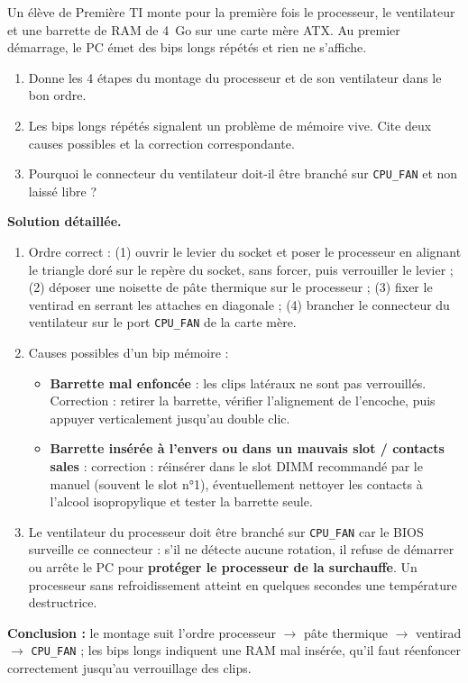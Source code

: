 \documentclass[11pt]{article}
\begin{document}
\begin{exoresolu}
Un élève de Première TI monte pour la première fois le processeur, le ventilateur et une barrette de RAM de \SI{4}{Go} sur une carte mère ATX. Au premier démarrage, le PC émet des bips longs répétés et rien ne s'affiche.
\begin{enumerate}
\item Donne les 4 étapes du montage du processeur et de son ventilateur dans le bon ordre.
\item Les bips longs répétés signalent un problème de mémoire vive. Cite deux causes possibles et la correction correspondante.
\item Pourquoi le connecteur du ventilateur doit-il être branché sur \texttt{CPU\_FAN} et non laissé libre ?
\end{enumerate}
\tcblower
\textbf{Solution détaillée.}
\begin{enumerate}
\item Ordre correct : (1) ouvrir le levier du socket et poser le processeur en alignant le triangle doré sur le repère du socket, sans forcer, puis verrouiller le levier ; (2) déposer une noisette de pâte thermique sur le processeur ; (3) fixer le ventirad en serrant les attaches en diagonale ; (4) brancher le connecteur du ventilateur sur le port \texttt{CPU\_FAN} de la carte mère.
\item Causes possibles d'un bip mémoire :
\begin{itemize}
\item \textbf{Barrette mal enfoncée} : les clips latéraux ne sont pas verrouillés. Correction : retirer la barrette, vérifier l'alignement de l'encoche, puis appuyer verticalement jusqu'au double clic.
\item \textbf{Barrette insérée à l'envers ou dans un mauvais slot / contacts sales} : correction : réinsérer dans le slot DIMM recommandé par le manuel (souvent le slot n°1), éventuellement nettoyer les contacts à l'alcool isopropylique et tester la barrette seule.
\end{itemize}
\item Le ventilateur du processeur doit être branché sur \texttt{CPU\_FAN} car le BIOS surveille ce connecteur : s'il ne détecte aucune rotation, il refuse de démarrer ou arrête le PC pour \textbf{protéger le processeur de la surchauffe}. Un processeur sans refroidissement atteint en quelques secondes une température destructrice.
\end{enumerate}
\textbf{Conclusion :} le montage suit l'ordre processeur $\rightarrow$ pâte thermique $\rightarrow$ ventirad $\rightarrow$ \texttt{CPU\_FAN} ; les bips longs indiquent une RAM mal insérée, qu'il faut réenfoncer correctement jusqu'au verrouillage des clips.
\end{exoresolu}
\end{document}
